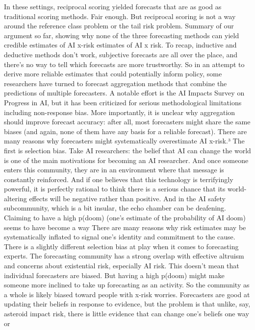 In these settings, reciprocal scoring yielded forecasts that are as
good as traditional scoring methods. Fair enough. But reciprocal
scoring is not a way around the reference class problem or the tail
risk problem.
Summary of our argument so far, showing why none of
the three forecasting methods can yield credible
estimates of AI x-risk
estimates of AI x risk.
To recap, inductive and deductive methods don’t work, subjective
forecasts are all over the place, and there’s no way to tell which
forecasts are more trustworthy.
So in an attempt to derive more reliable estimates that could
potentially inform policy, some researchers have turned to forecast
aggregation methods that combine the predictions of multiple
forecasters. A notable effort is the AI Impacts Survey on Progress in
AI, but it has been criticized for serious methodological limitations
including non-response bias. More importantly, it is unclear why
aggregation should improve forecast accuracy: after all, most
forecasters might share the same biases (and again, none of them
have any basis for a reliable forecast).
There are many reasons why forecasters might systematically
overestimate AI x-risk.³ The ﬁrst is selection bias. Take AI
researchers: the belief that AI can change the world is one of the
main motivations for becoming an AI researcher. And once someone
enters this community, they are in an environment where that
message is constantly reinforced. And if one believes that this
technology is terrifyingly powerful, it is perfectly rational to think there
is a serious chance that its world-altering effects will be negative
rather than positive.
And in the AI safety subcommunity, which is a bit insular, the echo
chamber can be deafening. Claiming to have a high p(doom) (one’s
estimate of the probability of AI doom) seems to have become a way
There are many reasons why risk estimates
may be systematically inflated
to signal one’s identity and commitment to the cause.
There is a slightly different selection bias at play when it comes to
forecasting experts. The forecasting community has a strong overlap
with effective altruism and concerns about existential risk, especially
AI risk. This doesn’t mean that individual forecasters are biased. But
having a high p(doom) might make someone more inclined to take
up forecasting as an activity. So the community as a whole is likely
biased toward people with x-risk worries.
Forecasters are good at updating their beliefs in response to
evidence, but the problem is that unlike, say, asteroid impact risk,
there is little evidence that can change one’s beliefs one way or
